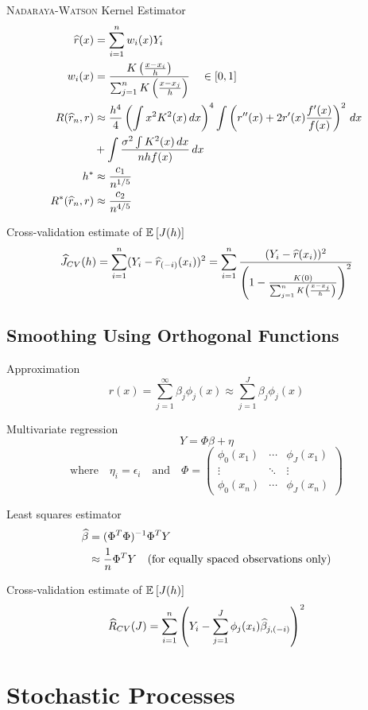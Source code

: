 \documentclass[landscape]{article}
\begin{document}
\begin{multicols*}{2}
\textsc{Nadaraya-Watson} Kernel Estimator
\begin{align*}
\widehat{r}(x) &= \sum_{i=1}^n w_i(x)Y_i \\
w_i(x)
&= \frac{K\left(\frac{x-x_i}{h}\right)}{\sum_{j=1}^n K\left(\frac{x-x_j}{h}\right)}
\quad \in [0,1] \\
R(\widehat{r}_n,r) &\approx \frac{h^4}{4} \left( \int x^2K^2(x)\,dx \right)^4
\int \left( r''(x) + 2r'(x)\frac{f'(x)}{f(x)}\right)^2 \,dx \\
&+ \int \frac{\sigma^2 \int K^2(x) \,dx}{nhf(x)}\,dx \\
h^* &\approx \frac{c_1}{n^{1/5}} \\
R^*(\widehat{r}_n,r) &\approx \frac{c_2}{n^{4/5}} \\
\end{align*}

Cross-validation estimate of $\mathbb{E}_{}\left[J(h)\right]$
\[\widehat{J}_{CV}(h)
= \sum_{i=1}^n (Y_i - \widehat{r}_{(-i)}(x_i))^2
= \sum_{i=1}^n \frac{(Y_i - \widehat{r}(x_i))^2}{\left(
1- \frac{K(0)}{\sum_{j=1}^n K\left(\frac{x-x_j}{h}\right)}\right)^2}\]

\subsection{Smoothing Using Orthogonal Functions}

Approximation
\[r(x) = \sum_{j=1}^\infty\beta_j\phi_j(x)
\approx \sum_{j=1}^J \beta_j\phi_j(x)\]

Multivariate regression
\[Y = \Phi\beta + \eta\]
\[\text{where}\quad \eta_i = \epsilon_i \quad\text{and}\quad \Phi
= \begin{pmatrix}
  \phi_0(x_1) & \cdots & \phi_J(x_1) \\
  \vdots & \ddots & \vdots \\
  \phi_0(x_n) & \cdots & \phi_J(x_n)
  \end{pmatrix}\]

Least squares estimator
\begin{align*}
\widehat{\beta} &= (\Phi^T\Phi)^{-1}\Phi^T Y \\
&\approx \frac{1}{n}\Phi^T Y
  \quad\text{(for equally spaced observations only)}
\end{align*}

Cross-validation estimate of $\mathbb{E}_{}\left[J(h)\right]$
\[\widehat{R}_{CV}(J)
= \sum_{i=1}^n \left( Y_i - \sum_{j=1}^J \phi_j(x_i)\widehat{\beta}_{j,(-i)} \right)^2\]

\section{Stochastic Processes}


\end{multicols*}
\end{document}
